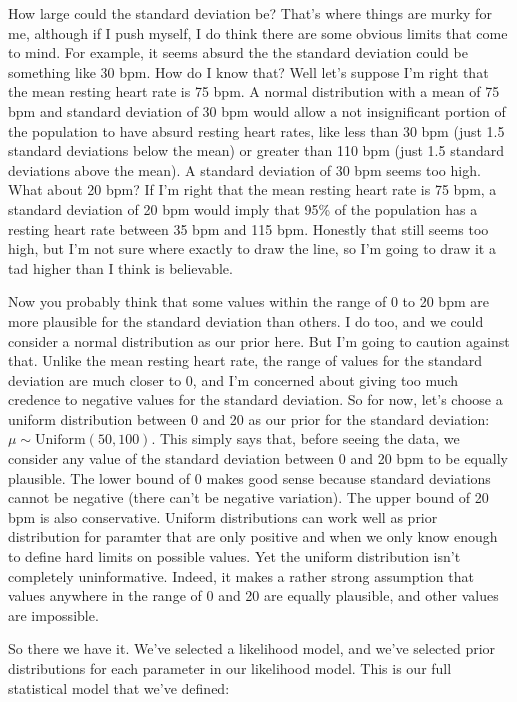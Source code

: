 \documentclass[
]{book}
\begin{document}
How large could the standard deviation be? That's where things are murky for me, although if I push myself, I do think there are some obvious limits that come to mind. For example, it seems absurd the the standard deviation could be something like 30 bpm. How do I know that? Well let's suppose I'm right that the mean resting heart rate is 75 bpm. A normal distribution with a mean of 75 bpm and standard deviation of 30 bpm would allow a not insignificant portion of the population to have absurd resting heart rates, like less than 30 bpm (just 1.5 standard deviations below the mean) or greater than 110 bpm (just 1.5 standard deviations above the mean). A standard deviation of 30 bpm seems too high. What about 20 bpm? If I'm right that the mean resting heart rate is 75 bpm, a standard deviation of 20 bpm would imply that 95\% of the population has a resting heart rate between 35 bpm and 115 bpm. Honestly that still seems too high, but I'm not sure where exactly to draw the line, so I'm going to draw it a tad higher than I think is believable.

Now you probably think that some values within the range of 0 to 20 bpm are more plausible for the standard deviation than others. I do too, and we could consider a normal distribution as our prior here. But I'm going to caution against that. Unlike the mean resting heart rate, the range of values for the standard deviation are much closer to 0, and I'm concerned about giving too much credence to negative values for the standard deviation. So for now, let's choose a uniform distribution between 0 and 20 as our prior for the standard deviation: \(\mu \sim \mathrm{Uniform}(50, 100)\). This simply says that, before seeing the data, we consider any value of the standard deviation between 0 and 20 bpm to be equally plausible. The lower bound of 0 makes good sense because standard deviations cannot be negative (there can't be negative variation). The upper bound of 20 bpm is also conservative. Uniform distributions can work well as prior distribution for paramter that are only positive and when we only know enough to define hard limits on possible values. Yet the uniform distribution isn't completely uninformative. Indeed, it makes a rather strong assumption that values anywhere in the range of 0 and 20 are equally plausible, and other values are impossible.

So there we have it. We've selected a likelihood model, and we've selected prior distributions for each parameter in our likelihood model. This is our full statistical model that we've defined:
\end{document}
